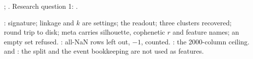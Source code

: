 \citet{ward1963hierarchical}; \citet{rousseeuw1987silhouettes}. Research question 1:
.

: signature; linkage and $k$ are settings; the readout; three
clusters recovered; round trip to disk; meta carries silhouette, cophenetic $r$ and feature names;
an empty set refused. : all-NaN rows left out, $-1$,
counted. : the 2000-column ceiling.
 and : the
split and the event bookkeeping are not used as features.

